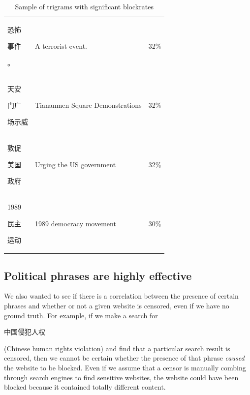 \begin{table}[t]
\begin{center}
{\begin{tabular}{ l | l | c }
        \begin{CJK*}{UTF8}{gbsn}恐怖\end{CJK*} \begin{CJK*}{UTF8}{gbsn}事件\end{CJK*} \begin{CJK*}{UTF8}{gbsn}。\end{CJK*} & A terrorist event. & 32\% \\
        \begin{CJK*}{UTF8}{gbsn}天安\end{CJK*} \begin{CJK*}{UTF8}{gbsn}门广\end{CJK*} \begin{CJK*}{UTF8}{gbsn}场示威\end{CJK*} & Tiananmen Square Demonstrations & 32\% \\
        \begin{CJK*}{UTF8}{gbsn}敦促\end{CJK*} \begin{CJK*}{UTF8}{gbsn}美国\end{CJK*} \begin{CJK*}{UTF8}{gbsn}政府\end{CJK*} & Urging the US government & 32\% \\
        \begin{CJK*}{UTF8}{gbsn}1989\end{CJK*} \begin{CJK*}{UTF8}{gbsn}民主\end{CJK*} \begin{CJK*}{UTF8}{gbsn}运动\end{CJK*} & 1989 democracy movement & 30\% \\
      \end{tabular}}
  \end{center}
  \caption{\label{effective-trigrams}Sample of trigrams with
    significant blockrates}
\end{table}

\subsection{Political phrases are highly effective}
\label{phrases-eval}

We also wanted to see if there is a correlation between the
presence of certain phrases and whether or not a given website is
censored, even if we have no ground truth.  For example, if we make a search
for \begin{CJK*}{UTF8}{gbsn}中国侵犯人权\end{CJK*} (Chinese human
rights violation) and find that a particular search result is
censored, then we cannot be certain whether the presence of that phrase
\textit{caused} the website to be blocked. Even if we assume 
that a censor is manually combing through search engines to find
sensitive websites, the website could have been blocked because it
contained totally different content.

